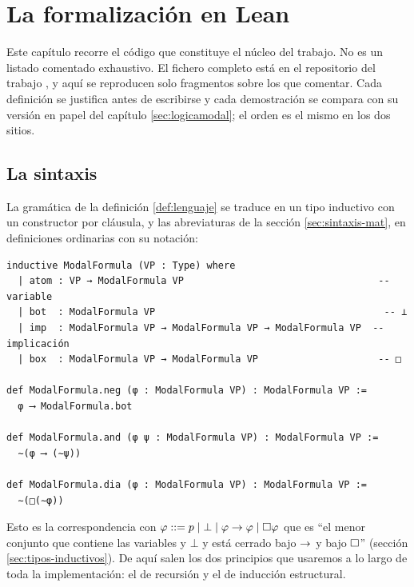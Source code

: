 \chapter{La formalización en Lean}\label{sec:formalizacion}

Este capítulo recorre el código que constituye el núcleo del trabajo. No es un listado comentado exhaustivo. El fichero completo está en el repositorio del trabajo \cite{repolean}, y aquí se reproducen solo fragmentos sobre los que comentar. Cada definición se justifica antes de escribirse y cada demostración se compara con su versión en papel del capítulo \ref{sec:logicamodal}; el orden es el mismo en los dos sitios.

\section{La sintaxis}\label{sec:form-sintaxis}

La gramática de la definición \ref{def:lenguaje} se traduce en un tipo inductivo con un constructor por cláusula, y las abreviaturas de la sección \ref{sec:sintaxis-mat}, en definiciones ordinarias con su notación:

\begin{lstlisting}
inductive ModalFormula (VP : Type) where
  | atom : VP → ModalFormula VP                                  -- variable
  | bot  : ModalFormula VP                                        -- ⊥
  | imp  : ModalFormula VP → ModalFormula VP → ModalFormula VP  -- implicación
  | box  : ModalFormula VP → ModalFormula VP                     -- □

def ModalFormula.neg (φ : ModalFormula VP) : ModalFormula VP :=
  φ ⟶ ModalFormula.bot

def ModalFormula.and (φ ψ : ModalFormula VP) : ModalFormula VP :=
  ∼(φ ⟶ (∼ψ))

def ModalFormula.dia (φ : ModalFormula VP) : ModalFormula VP :=
  ∼(□(∼φ))
\end{lstlisting}

Esto es la correspondencia con $\varphi ::= p \mid \bot \mid \varphi \to \varphi \mid \square\varphi$ que es ``el menor conjunto que contiene las variables y $\bot$ y está cerrado bajo $\to$ y bajo $\square$'' (sección \ref{sec:tipos-inductivos}). De aquí salen los dos principios que usaremos a lo largo de toda la implementación: el de recursión y el de inducción estructural.

